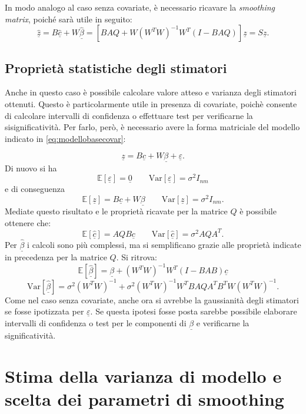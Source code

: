 \documentclass[a4paper,11pt,twoside,openright]{book}							%
\begin{document}
In modo analogo al caso senza covariate, è necessario ricavare la \textit{smoothing matrix}, poiché sarà utile in seguito:
$$
\hat  {\underline z} =B\hat  {\underline c} + W \hat  {\underline \beta} = [B AQ + W(W^TW)^{-1}W^T(I-B AQ)]\underline z = S\underline z .
$$

\subsection{Proprietà statistiche degli stimatori}
\label{sec:IC}
Anche in questo caso è possibile calcolare valore atteso e varianza degli stimatori ottenuti. Questo è particolarmente utile in presenza di covariate, poichè consente di calcolare intervalli di confidenza o effettuare test per verificarne la sisignificatività. Per farlo, però, è necessario avere la forma matriciale del modello indicato in \ref{eq:modellobasecovar}:

\begin{equation}
\label{eq:modellobasecovarmatric}
\underline z=B \underline c + W \underline \beta + \underline \varepsilon .
\end{equation}
Di nuovo si ha 
$$
\mathbb{E}[\underline \varepsilon] = \underline 0 \qquad \mathrm{Var}[\underline \varepsilon] = \sigma^2 I_{nm}
$$
e di conseguenza
$$
\mathbb{E}[\underline z] = B \underline c + W \underline \beta \qquad \mathrm{Var}[\underline z] = \sigma^2 I_{nm} .
$$
Mediate questo risultato e le proprietà ricavate per la matrice $Q$ è possibile ottenere che:
$$
\mathbb{E}[\hat  {\underline c}] = AQB \underline c \qquad \mathrm{Var}[\hat  {\underline c}] = \sigma^2 AQA^T .
$$
Per $\hat  {\underline \beta}$ i calcoli sono più complessi, ma si semplificano grazie alle proprietà indicate in precedenza per la matrice $Q$. Si ritrova:
$$
\mathbb{E}[\hat  {\underline \beta}] = \underline \beta + (W^TW)^{-1}W^T(I-B AB)\underline c
$$
$$ \mathrm{Var}[\hat  {\underline \beta}] = \sigma^2 (W^TW)^{-1} + \sigma^2 (W^TW)^{-1}W^T B A Q A^T B^T W(W^TW)^{-1}.
$$
Come nel caso senza covariate, anche ora si avrebbe la gaussianità degli stimatori se fosse ipotizzata per $\underline \varepsilon$. Se questa ipotesi fosse posta sarebbe possibile elaborare intervalli di confidenza o test per le componenti di $\underline \beta$ e verificarne la significatività. 


\section{Stima della varianza di modello e scelta dei parametri di smoothing}
\label{sez:GCV}
\end{document}
